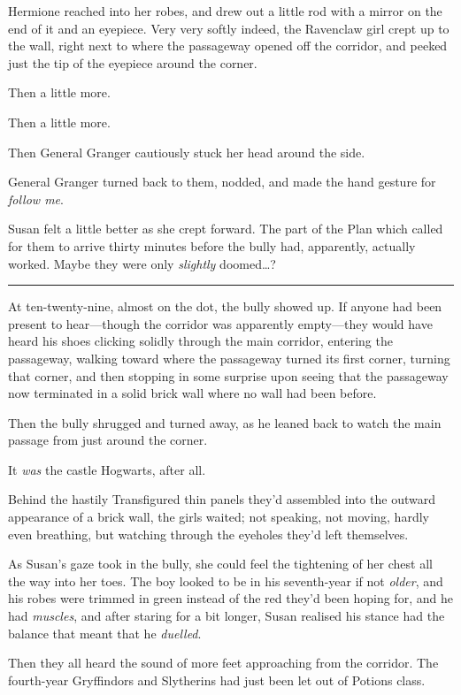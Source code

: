 Hermione reached into her robes, and drew out a little rod with a mirror
on the end of it and an eyepiece. Very very softly indeed, the Ravenclaw
girl crept up to the wall, right next to where the passageway opened off
the corridor, and peeked just the tip of the eyepiece around the corner.

Then a little more.

Then a little more.

Then General Granger cautiously stuck her head around the side.

General Granger turned back to them, nodded, and made the hand gesture
for \emph{follow me}.

Susan felt a little better as she crept forward. The part of the Plan
which called for them to arrive thirty minutes before the bully had,
apparently, actually worked. Maybe they were only \emph{slightly}
doomed\ldots{}?

\begin{center}\rule{3in}{0.4pt}\end{center}

At ten-twenty-nine, almost on the dot, the bully showed up. If anyone
had been present to hear---though the corridor was apparently
empty---they would have heard his shoes clicking solidly through the
main corridor, entering the passageway, walking toward where the
passageway turned its first corner, turning that corner, and then
stopping in some surprise upon seeing that the passageway now terminated
in a solid brick wall where no wall had been before.

Then the bully shrugged and turned away, as he leaned back to watch the
main passage from just around the corner.

It \emph{was} the castle Hogwarts, after all.

Behind the hastily Transfigured thin panels they'd assembled into the
outward appearance of a brick wall, the girls waited; not speaking, not
moving, hardly even breathing, but watching through the eyeholes they'd
left themselves.

As Susan's gaze took in the bully, she could feel the tightening of her
chest all the way into her toes. The boy looked to be in his
seventh-year if not \emph{older}, and his robes were trimmed in green
instead of the red they'd been hoping for, and he had \emph{muscles},
and after staring for a bit longer, Susan realised his stance had the
balance that meant that he \emph{duelled}.

Then they all heard the sound of more feet approaching from the
corridor. The fourth-year Gryffindors and Slytherins had just been let
out of Potions class.

